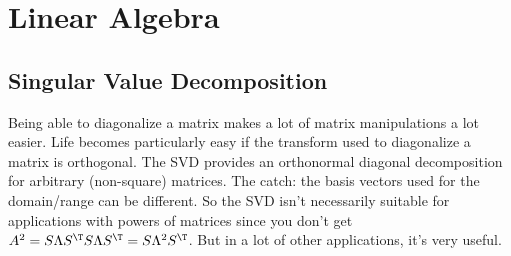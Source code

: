 \chapter{Linear Algebra}

\section{Singular Value Decomposition} \label{sec:SVD}
Being able to diagonalize a matrix makes a lot of matrix manipulations a lot easier. Life becomes particularly easy if the transform used to diagonalize a matrix is orthogonal. The SVD provides an orthonormal diagonal decomposition for arbitrary (non-square) matrices. The catch: the basis vectors used for the domain/range can be different. So the SVD isn't necessarily suitable for applications with powers of matrices since you don't get $A^2 = S \Lambda S^\T S \Lambda S^\T = S \Lambda^2 S^\T$. But in a lot of other applications, it's very useful. 

